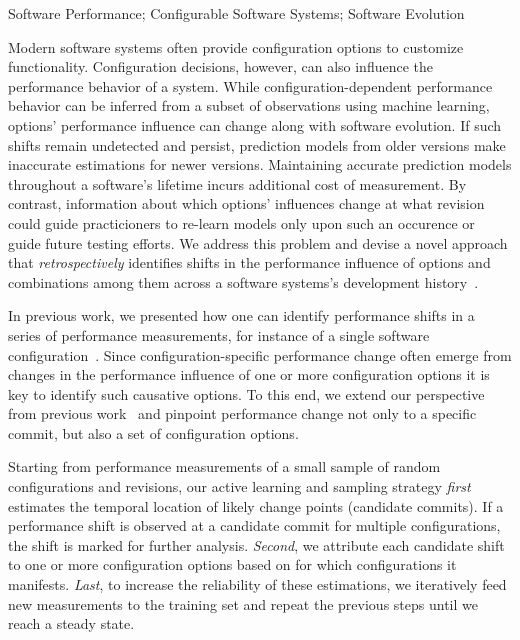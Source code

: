 \documentclass[utf8,biblatex]{lni}
\begin{document}
\begin{keywords}
Software Performance; Configurable Software Systems; Software Evolution
\end{keywords}

Modern software systems often provide configuration options to customize functionality. Configuration decisions, however, can also influence the performance behavior of a system. While configuration-dependent performance behavior can be inferred from a subset of observations using machine learning, options' performance influence can change along with software evolution. If such shifts remain undetected and persist, prediction models from older versions make inaccurate estimations for newer versions. Maintaining accurate prediction models throughout a software's lifetime incurs additional cost of measurement. By contrast, information about which options' influences change at what revision could guide practicioners to re-learn models only upon such an occurence or guide future testing efforts. 
We address this problem and devise a novel approach that \textit{retrospectively} identifies shifts in the performance influence of options and combinations among them across a software systems’s development history~\cite{muehlbauer_identifying_2020}. 

In previous work, we presented how one can identify performance shifts in a series of performance measurements, for instance of a single software configuration~\cite{muhlbauer_accurate_2019}.
Since configuration-specific performance change often emerge from changes in the performance influence of one or more configuration options it is key to identify such causative options. To this end, we extend our perspective from previous work~\cite{muhlbauer_accurate_2019} and pinpoint performance change not only to a specific commit, but also a set of configuration options. 

Starting from performance measurements of a small sample of random configurations and revisions, our active learning and sampling strategy \textit{first} estimates the temporal location of likely change points (candidate commits). If a performance shift is observed at a candidate commit for multiple configurations, the shift is marked for further analysis. \textit{Second}, we attribute each candidate shift to one or more configuration options based on for which configurations it manifests. \textit{Last}, to increase the reliability of these estimations, we iteratively feed new measurements to the training set and repeat the previous steps until we reach a steady state.
\end{document}
